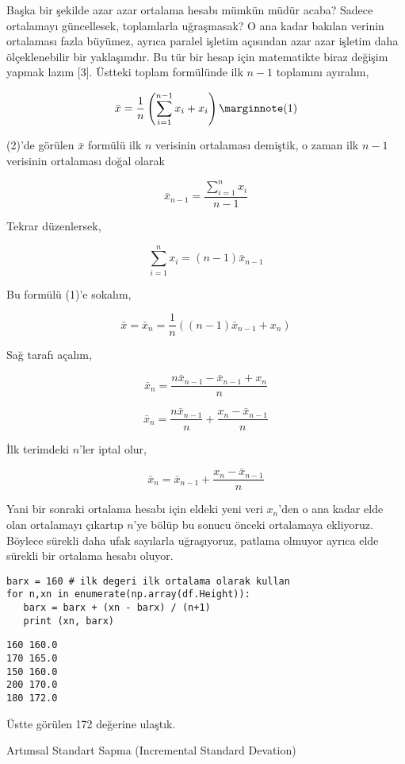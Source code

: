 \documentclass[12pt,fleqn]{article}\usepackage{../../common}
\begin{document}
Başka bir şekilde azar azar ortalama hesabı mümkün müdür acaba? Sadece
ortalamayı güncellesek, toplamlarla uğraşmasak? O ana kadar bakılan verinin
ortalaması fazla büyümez, ayrıca paralel işletim açısından azar azar işletim
daha ölçeklenebilir bir yaklaşımdır. Bu tür bir hesap için matematikte biraz
değişim yapmak lazım [3]. Üstteki toplam formülünde ilk $n-1$ toplamını
ayıralım,

$$
\bar{x} = \frac{1}{n} \left( \sum _{i=1}^{n-1} x_i + x_i \right)
\mlabel{1}
$$

(2)'de görülen $\bar{x}$ formülü ilk $n$ verisinin ortalaması demiştik, o zaman
ilk $n-1$ verisinin ortalaması doğal olarak

$$
\bar{x}_{n-1}  = \frac{\sum_{i=1}^{n} x_i}{n-1} 
$$

Tekrar düzenlersek,

$$
\sum_{i=1}^{n} x_i  = (n-1) \bar{x}_{n-1}  
$$

Bu formülü (1)'e sokalım,

$$
\bar{x} = \bar{x}_n = \frac{1}{n} \left( (n-1) \bar{x}_{n-1} + x_n \right)
$$

Sağ tarafı açalım,

$$
\bar{x}_n = \frac{n \bar{x}_{n-1} - \bar{x}_{n-1} + x_n}{n}
$$

$$
\bar{x}_n = \frac{n \bar{x}_{n-1}}{n} + \frac{x_n - \bar{x}_{n-1}}{n}
$$

İlk terimdeki $n$'ler iptal olur,

$$
\bar{x}_n = \bar{x}_{n-1} + \frac{x_n - \bar{x}_{n-1}}{n}
$$

Yani bir sonraki ortalama hesabı için eldeki yeni veri $x_n$'den o ana kadar
elde olan ortalamayı çıkartıp $n$'ye bölüp bu sonucu önceki ortalamaya
ekliyoruz. Böylece sürekli daha ufak sayılarla uğraşıyoruz, patlama olmuyor
ayrıca elde sürekli bir ortalama hesabı oluyor.

\begin{verbatim}
barx = 160 # ilk degeri ilk ortalama olarak kullan
for n,xn in enumerate(np.array(df.Height)):
   barx = barx + (xn - barx) / (n+1)
   print (xn, barx)   
\end{verbatim}

\begin{verbatim}
160 160.0
170 165.0
150 160.0
200 170.0
180 172.0
\end{verbatim}

Üstte görülen 172 değerine ulaştık.

Artımsal Standart Sapma (Incremental Standard Devation)
\end{document}
